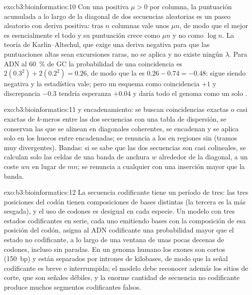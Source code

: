 \begin{solution}{exo:b3:bioinformatics:10}
Con una  positiva $\mu > 0$ por columna, la puntuación
acumulada a lo largo de la diagonal de dos secuencias aleatorias es un
paseo aleatorio con deriva positiva: tras $n$ columnas vale unos $\mu n$,
de modo que el mejor  es esencialmente el todo y su
puntuación crece como $\mu n$ y no como $\log n$. La teoría de
Karlin--Altschul, que exige una deriva negativa para que las
puntuaciones altas sean excursiones raras, no se aplica y no existe
ningún $\lambda$. Para ADN al \qty{60}{\%} de GC la probabilidad de una
coincidencia es $2(0.3^{2}) + 2(0.2^{2}) = 0.26$, de modo que la
 es $0.26 - 0.74 = -0.48$: sigue siendo negativa y la
estadística vale; pero un esquema como coincidencia $+1$ y discrepancia
$-0.3$ tendría esperanza $+0.04$ y daría todo el genoma como un solo
.
\end{solution}

\begin{solution}{exo:b3:bioinformatics:11}
 y encadenamiento: se buscan coincidencias exactas o casi exactas
de $k$-meros entre las dos secuencias con una tabla de dispersión, se
conservan las que se alinean en diagonales coherentes, se encadenan y se
aplica  solo en los huecos entre 
encadenadas; se renuncia a los  en regiones sin 
(tramos muy divergentes). Bandas: si se sabe que las dos secuencias son
casi colineales, se calculan solo las celdas de una banda de anchura $w$
alrededor de la diagonal, a un coste $wn$ en lugar de $mn$; se renuncia a
cualquier  con una inserción mayor que la banda.
\end{solution}

\begin{solution}{exo:b3:bioinformatics:12}
La secuencia codificante tiene un período de tres: las tres posiciones
del codón tienen composiciones de bases distintas (la tercera es la más
sesgada), y el uso de codones es desigual en cada especie. Un modelo con
tres estados codificantes en serie, cada uno emitiendo bases con la
composición de esa posición del codón, asigna al ADN codificante una
probabilidad mayor que el estado no codificante, a lo largo de una
ventana de unas pocas decenas de codones, incluso sin paradas. En un
genoma humano los exones son cortos (\qty{150}{bp}) y están separados por
intrones de kilobases, de modo que la señal codificante es breve e
interrumpida; el modelo debe reconocer además los sitios de corte, que
son señales débiles, y la enorme cantidad de secuencia no codificante
produce muchos segmentos codificantes falsos.
\end{solution}


